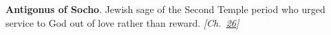 \textbf{Antigonus of Socho}. Jewish sage of the Second Temple period who urged service to God out of love rather than reward. \emph{[Ch.~\hyperref[ch:jewishcalendar]{26}]}


